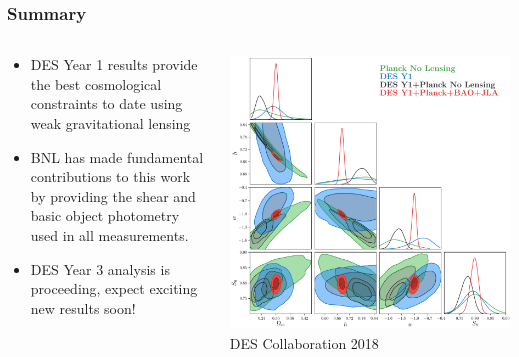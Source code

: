 \documentclass[aspectratio=169]{beamer}
\begin{document}
\frame
{

    \frametitle{Summary}


    \begin{columns}
        \begin{column}{0.5\textwidth}
            \begin{itemize}

                \item DES Year 1 results provide the best
                    cosmological constraints to date using
                    weak gravitational lensing

                \item BNL has made fundamental contributions to this work by
                    providing the shear and basic object photometry used in
                    all measurements.

                \item DES Year 3 analysis is proceeding, expect exciting
                    new results soon!

            \end{itemize}

        \end{column}
        \begin{column}{0.5\textwidth}
            \centering
                \includegraphics[width=\linewidth]{dpnl_w_4.pdf}
                \newline
                {\tiny DES Collaboration 2018}
        \end{column}

    \end{columns}

}
\end{document}

